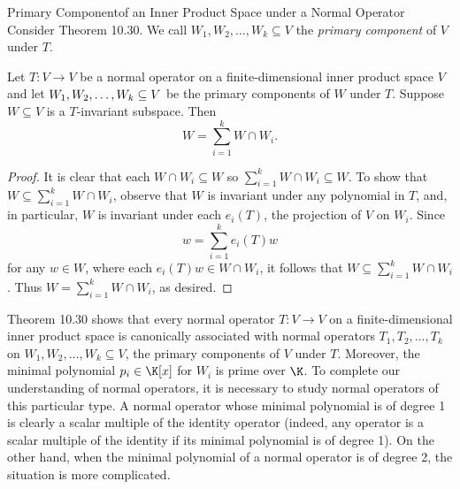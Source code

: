 \documentclass[linearalgebra]{subfiles}
\begin{document}
    \begin{definition}{Primary Component}{of an Inner Product Space under a Normal Operator}
        Consider Theorem 10.30. We call $W_1,W_2,\ldots,W_k\subseteq V$ the \emph{primary component} of $V$ under $T$.
    \end{definition}

    \begin{cor}{}
        Let $T:V\to V$ be a normal operator on a finite-dimensional inner product space $V$ and let $W_1,W_2,\ldots,W_k\\\subseteq V$ be the primary components of $W$ under $T$. Suppose $W\subseteq V$ is a $T$-invariant subspace. Then
        \begin{equation*}
            W = \sum^{k}_{i=1} W\cap W_i.
        \end{equation*}
    \end{cor}	

    \begin{proof}
        It is clear that each $W\cap W_i\subseteq W$ so $\sum^{k}_{i=1} W\cap W_i\subseteq W$. To show that $W\subseteq \sum^{k}_{i=1} W\cap W_i$, observe that $W$ is invariant under any polynomial in $T$, and, in particular, $W$ is invariant under each $e_i(T)$, the projection of $V$ on $W_i$. Since
        \begin{equation*}
            w = \sum^{k}_{i=1} e_i(T)w
        \end{equation*}
        for any $w\in W$, where each $e_i(T)w\in W\cap W_i$, it follows that $W\subseteq\sum^{k}_{i=1} W\cap W_i$. Thus $W = \sum^{k}_{i=1} W\cap W_i$, as desired.
    \end{proof}

    \begin{remark}
        Theorem 10.30 shows that every normal operator $T:V\to V$ on a finite-dimensional inner product space is canonically associated with normal operators $T_1, T_2, \ldots, T_k$ on $W_1,W_2,\ldots,W_k\subseteq V$, the primary components of $V$ under $T$. Moreover, the minimal polynomial $p_i\in\K[x]$ for $W_i$ is prime over $\K$. To complete our understanding of normal operators, it is necessary to study normal operators of this particular type. A normal operator whose minimal polynomial is of degree 1 is clearly a scalar multiple of the identity operator (indeed, any operator is a scalar multiple of the identity if its minimal polynomial is of degree 1). On the other hand, when the minimal polynomial of a normal operator is of degree 2, the situation is more complicated.
    \end{remark}
\end{document}
